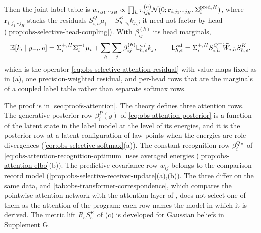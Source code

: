 Then the joint label table is
\(w_{i,j_1\cdots j_H}\propto\prod_h\pi^{(h)}_{ij_h}
\mathcal N(0;\mathbf r_{i,j_1\cdots j_H},\Sigma_i^{{\rm pred},H})\), where
\(\mathbf r_{i,j_1\cdots j_H}\) stacks the residuals
\(S^Q_{i,h}\mu_i-S^K_{h,e_h}k_{j_h}\); it need not factor by head
(\cref{prop:obs-selective-head-coupling}). With
\(\beta^{(h)}_{ij}\) its head marginals,
\begin{equation}
\mathbb E[k_i\mid y_{-i},o]=\Sigma_i^{+,H}\Sigma_i^{-1}\mu_i
+\sum_h\sum_j\beta^{(h)}_{ij}\mathsf L^{\rm val}_{h,e}k_j,
\qquad
\mathsf L^{\rm val}_{h,e}=\Sigma_i^{+,H}S_{i,h}^{Q\top}\widetilde W_{i,h}S^K_{h,e},
\label{eq:obs-selective-multihead-update}
\end{equation}
which is the operator \eqref{eq:obs-selective-attention-residual} with value
maps fixed as in (a), one precision-weighted residual, and per-head rows that
are the marginals of a coupled label table rather than separate softmax rows.

The proof is in \cref{sec:proofs-attention}.
The theory defines three attention rows. The generative posterior row
\(\beta^P_i(y)\) of \eqref{eq:obs-attention-posterior} is a function of the
latent state in the label model at the level of its energies, and it is the
posterior row at a latent configuration of law points when the energies are
role divergences (\cref{cor:obs-selective-softmax}(a)). The constant
recognition row \(\beta^{Q\star}_i\) of
\eqref{eq:obs-attention-recognition-optimum} uses averaged energies
(\cref{prop:obs-attention-elbo}(b)). The predictive-covariance row \(w_{ij}\)
belongs to the comparison-record model
(\cref{prop:obs-selective-receiver-update}(a),(b)). The three differ on the
same data, and \cref{tab:obs-transformer-correspondence}, which compares the
pointwise attention network with the attention layer of
\citet{vaswani2017attention}, does not select one of them as the attention of
the program: each row names the model in which it is derived. The metric lift
\(R_eS^K_e\) of (c) is developed for Gaussian beliefs in Supplement G.

